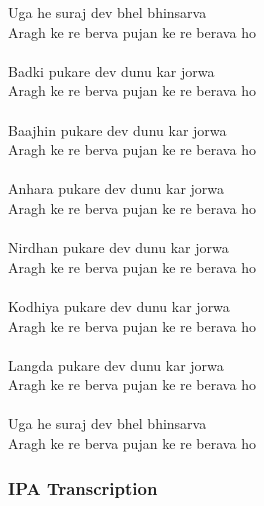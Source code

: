 \documentclass[17pt]{extarticle}
\begin{document}
Uga he suraj dev bhel bhinsarva \\
Aragh ke re berva pujan ke re berava ho\\\\
Badki pukare dev dunu kar jorwa \\
Aragh ke re berva pujan ke re berava ho\\\\
Baajhin pukare dev dunu kar jorwa \\
Aragh ke re berva pujan ke re berava ho\\\\
Anhara pukare dev dunu kar jorwa \\
Aragh ke re berva pujan ke re berava ho\\\\
Nirdhan pukare dev dunu kar jorwa \\
Aragh ke re berva pujan ke re berava ho\\\\
Kodhiya pukare dev dunu kar jorwa \\
Aragh ke re berva pujan ke re berava ho\\\\
Langda pukare dev dunu kar jorwa \\
Aragh ke re berva pujan ke re berava ho\\\\
Uga he suraj dev bhel bhinsarva \\
Aragh ke re berva pujan ke re berava ho\\

\subsubsection*{\textbf{IPA Transcription}}
\end{document}

